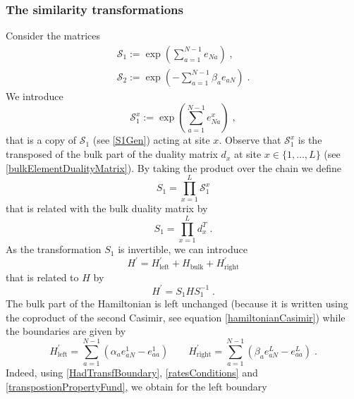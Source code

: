 \documentclass[10pt]{article}
\numberwithin{equation}{section}
\numberwithin{equation}{subsection}
\newcommand{\co}{\;,}
\newcommand{\dt}{\;.}
\begin{document}
\subsubsection{The similarity transformations}\label{subsectionSTransf}
Consider the matrices
\begin{align}
	\mathcal{S}_{1}:=\exp{\left(\sum_{a=1}^{N-1}e_{Na}\right)}\label{S1Gen}\co\\
	\mathcal{S}_{2}:=\exp{\left(-\sum_{a=1}^{N-1}\beta_{a}e_{aN}\right)}\dt\label{S2Gen}
\end{align}
We introduce
\begin{equation}\label{transformationV}
 \mathcal{S}_{1}^{x}:=\exp{\left(\sum_{a=1}^{N-1}e_{Na}^{x}\right)}\co %
\end{equation}
that is a copy of $\mathcal{S}_{1}$ (see \eqref{S1Gen}) acting at site $x$. 
Observe that $\mathcal{S}_{1}^{x}$ is the transposed of the bulk part of the duality matrix $d_{x}$  at site $x\in \{1,\ldots,L\}$ (see \eqref{bulkElementDualityMatrix}). By taking the product over the chain we define
\begin{equation}\label{S1-Whole}
    S_{1}=\prod_{x=1}^{L}\mathcal{S}_{1}^{x}
\end{equation}
that is related with the bulk duality matrix by 
\begin{equation}
S_{1}=\prod_{x=1}^{L}d_{x}^{T}\dt
\end{equation}
 As the transformation $S_{1}$ is invertible,  we can introduce 
\begin{equation}\label{hatHamiltonian}
   H^{'}=H^{'}_{\text{left}}+H_{\text{bulk}}+H^{'}_{\text{right}}
\end{equation}
that is related to $H$ by
\begin{equation}\label{similarV}
   H^{'}=S_{1}HS_{1}^{-1}\dt
\end{equation}
The bulk part of the Hamiltonian is left unchanged (because it is written using the coproduct of the second Casimir, see equation \eqref{hamiltonianCasimir}) while the boundaries are given by 
\begin{equation}
	H^{'}_{\text{left}}=\sum_{a=1}^{N-1}\left(\alpha_{a}e_{aN}^{1}-e_{aa}^{1}\right)\qquad H^{'}_{\text{right}}=\sum_{a=1}^{N-1}\left(\beta_{a}e_{aN}^{L}-e_{aa}^{L}\right)\dt
\end{equation}
Indeed, using \eqref{HadTransfBoundary}, \eqref{ratesConditions} and \eqref{transpostionPropertyFund}, we obtain for the left boundary
\end{document}
